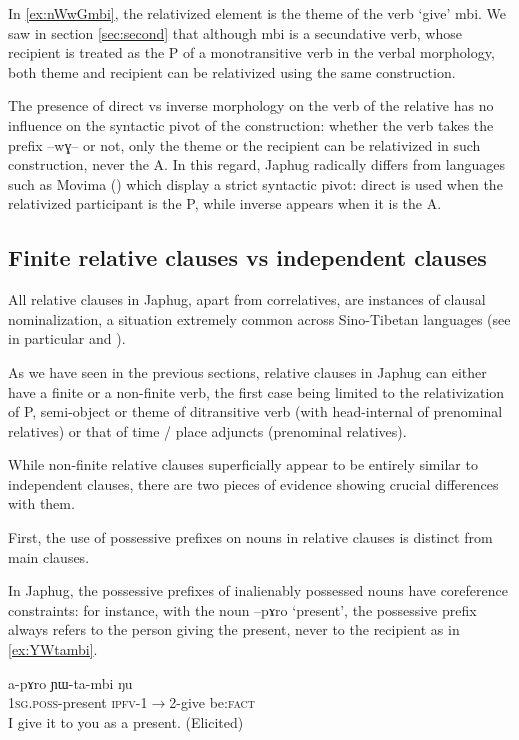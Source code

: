 \documentclass[oldfontcommands,oneside,a4paper,11pt]{article}
\newcommand{\ipa}[1]{{\phon #1}} %
\begin{document}
In \ref{ex:nWwGmbi}, the relativized element is the theme of the verb `give' \ipa{mbi}. We saw in section \ref{sec:second} that although \ipa{mbi} is a secundative verb, whose recipient is treated as the P of a monotransitive verb in the verbal morphology, both  theme  and recipient can be relativized using the same construction.

The presence of direct vs inverse morphology on the verb of the relative has no influence on the syntactic pivot of the construction: whether the verb takes the prefix \ipa{--wɣ--} or not, only the theme or the recipient can be relativized in such construction, never the A. In this regard, Japhug radically differs from languages such as Movima (\citealt[526-7]{haude09hierarchical}) which display a strict syntactic pivot: direct is used when the relativized participant is the P, while inverse appears when it is the A.


 \subsection{Finite relative clauses vs independent clauses}
All relative clauses in Japhug, apart from correlatives, are instances of clausal nominalization, a situation extremely common across Sino-Tibetan languages (see in particular \citealt{genetti08nmlz} and \citealt{bickel99nmlz}).

As we have seen in the previous sections, relative clauses in Japhug can either have a finite or a non-finite verb, the first case being limited to the relativization of P, semi-object or theme of ditransitive verb (with head-internal of prenominal relatives) or that of time / place adjuncts (prenominal relatives). 

While non-finite relative clauses superficially appear to be entirely similar to independent clauses, there are two pieces of evidence showing crucial differences with them.

First, the use of possessive prefixes on nouns in relative clauses is distinct from main clauses.

In Japhug, the possessive prefixes of inalienably possessed nouns have coreference constraints: for instance, with the noun \ipa{--pɤro} `present', the possessive prefix always refers to the person giving the present, never to the recipient as in \ref{ex:YWtambi}. 
	
			\begin{exe}
\ex \label{ex:YWtambi}
\gll
	\ipa{a-pɤro}  	\ipa{ɲɯ-ta-mbi}  	\ipa{ŋu}  \\
	\textsc{1sg.poss}-present \textsc{ipfv}-1$\rightarrow$2-give be:\textsc{fact} \\
	\glt I give it to you as a present. (Elicited)
 	  \end{exe} 
	 
\end{document}
